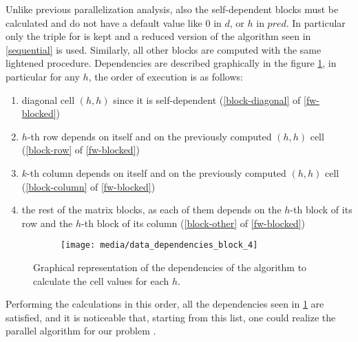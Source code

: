 Unlike previous parallelization analysis, also the self-dependent blocks must be calculated and do not have a default value like \(0\) in \(d\), or \(h\) in \(pred\). 
In particular only the triple for is kept and a reduced version of the algorithm seen in \cref{sequential} is used.
Similarly, all other blocks are computed with the same lightened procedure. Dependencies are described graphically in the figure \cref{data-dependency-external-loop-parallel}, in particular for any \(h\), the order of execution is as follows:

\begin{enumerate}
    \item diagonal cell \((h,h)\) since it is self-dependent (\cref{block-diagonal} of \cref{fw-blocked})
    \item \(h\)-th row depends on itself and on the previously computed  \((h,h)\) cell (\cref{block-row}  of \cref{fw-blocked})
    \item \(k\)-th column depends on itself and on the previously computed  \((h,h)\) cell (\cref{block-column}  of \cref{fw-blocked})
    \item the rest of the matrix blocks, as each of them depends on the \(h\)-th block of its row and the \(h\)-th block of its column (\cref{block-other}  of \cref{fw-blocked})
\end{enumerate}


\begin{figure}[htbp]
    \centering
    \begin{subfigure}[t]{0.8\textwidth}
        \centering
        \texttt{[image: media/data\_dependencies\_block\_4]}
    \end{subfigure}

    \caption{Graphical representation of the dependencies of the algorithm to calculate the cell values for each \(h\).}
    \label{data-dependency-external-loop-parallel}
\end{figure}

Performing the calculations in this order, all the dependencies seen in \cref{data-dependency-external-loop-parallel} are satisfied, and it is noticeable that, starting from this list, one could realize the parallel algorithm for our problem \cite{rucci}.

